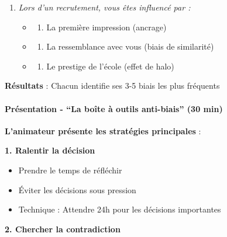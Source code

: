 \documentclass[
]{article}
\providecommand{\tightlist}{%
  \setlength{\itemsep}{0pt}\setlength{\parskip}{0pt}}
\begin{document}
\begin{enumerate}
\def\labelenumi{\arabic{enumi}.}
\tightlist
\item
  \emph{Lors d'un recrutement, vous êtes influencé par :}

  \begin{itemize}
  \tightlist
  \item
    \begin{enumerate}
    \def\labelenumii{\alph{enumii})}
    \tightlist
    \item
      La première impression (ancrage)
    \end{enumerate}
  \item
    \begin{enumerate}
    \def\labelenumii{\alph{enumii})}
    \setcounter{enumii}{1}
    \tightlist
    \item
      La ressemblance avec vous (biais de similarité)
    \end{enumerate}
  \item
    \begin{enumerate}
    \def\labelenumii{\alph{enumii})}
    \setcounter{enumii}{2}
    \tightlist
    \item
      Le prestige de l'école (effet de halo)
    \end{enumerate}
  \end{itemize}
\end{enumerate}

\textbf{Résultats} : Chacun identifie ses 3-5 biais les plus fréquents

\paragraph{Présentation - ``La boîte à outils anti-biais'' (30
min)}\label{pruxe9sentation---la-bouxeete-uxe0-outils-anti-biais-30-min}

\textbf{L'animateur présente les stratégies principales} :

\textbf{1. Ralentir la décision}

\begin{itemize}
\tightlist
\item
  Prendre le temps de réfléchir
\item
  Éviter les décisions sous pression
\item
  Technique : Attendre 24h pour les décisions importantes
\end{itemize}

\textbf{2. Chercher la contradiction}
\end{document}
